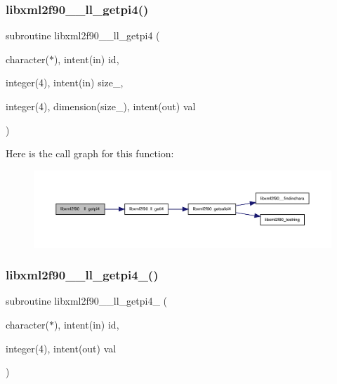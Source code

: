 \subsubsection{\texorpdfstring{libxml2f90\+\_\+\+\_\+ll\+\_\+getpi4()}{libxml2f90\_\_ll\_getpi4()}}
{\footnotesize\ttfamily subroutine libxml2f90\+\_\+\+\_\+ll\+\_\+getpi4 (\begin{DoxyParamCaption}\item[{character($\ast$), intent(in)}]{id,  }\item[{integer(4), intent(in)}]{size\+\_\+,  }\item[{integer(4), dimension(size\+\_\+), intent(out)}]{val }\end{DoxyParamCaption})}

Here is the call graph for this function\+:
\nopagebreak
\begin{figure}[H]
\begin{center}
\leavevmode
\includegraphics[width=350pt]{libxml2f90_8f90__pp_8f90_a02ca594441825f41fac314030efac043_cgraph}
\end{center}
\end{figure}
\mbox{\label{libxml2f90_8f90__pp_8f90_a3c828932bda4b9d96cb11bac75a064f2}} 
\subsubsection{\texorpdfstring{libxml2f90\+\_\+\+\_\+ll\+\_\+getpi4\+\_\+()}{libxml2f90\_\_ll\_getpi4\_()}}
{\footnotesize\ttfamily subroutine libxml2f90\+\_\+\+\_\+ll\+\_\+getpi4\+\_\+ (\begin{DoxyParamCaption}\item[{character($\ast$), intent(in)}]{id,  }\item[{integer(4), intent(out)}]{val }\end{DoxyParamCaption})}

